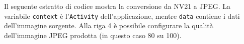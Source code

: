 %
%
%

Il seguente estratto di codice mostra la conversione da NV21 a JPEG. La variabile \texttt{context} è l'\texttt{Activity} dell'applicazione, mentre \texttt{data} contiene i dati dell'immagine sorgente. Alla riga 4 è possibile configurare la qualità dell'immagine JPEG prodotta (in questo caso 80 su 100).

